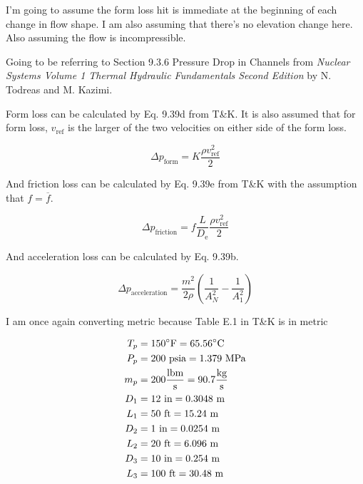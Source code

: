 \documentclass{article}
\begin{document}
I'm going to assume the form loss hit is immediate at the beginning of each change in flow shape. I am also assuming that there's no elevation change here. Also assuming the flow is incompressible.

Going to be referring to Section 9.3.6 Pressure Drop in Channels from \textit{Nuclear Systems Volume 1 Thermal Hydraulic Fundamentals Second Edition} by N. Todreas and M. Kazimi.

Form loss can be calculated by Eq. 9.39d from T\&K. It is also assumed that for form loss, $v_{\text{ref}}$ is the larger of the two velocities on either side of the form loss.

\begin{equation}
    \Delta p_{\text{form}} = K \frac{\rho v_{\text{ref}}^2}{2}
\end{equation}

And friction loss can be calculated by Eq. 9.39e from T\&K with the assumption that $f = \overline{f}$.

\begin{equation}
    \Delta p_{\text{friction}} = f \frac{L}{D_{\text{e}}} \frac{\rho v_{\text{ref}}^2}{2}
\end{equation}

And acceleration loss can be calculated by Eq. 9.39b.

\begin{equation}
    \Delta p_{\text{acceleration}} = \frac{m^2}{2 \rho} (\frac{1}{A_N^2} - \frac{1}{A_1^2})
\end{equation}

I am once again converting metric because Table E.1 in T\&K is in metric

\begin{align*}
    T_p &= 150 \degree \text{F} = 65.56 \degree \text{C} \\
    P_p &= 200 \text{ psia} = 1.379 \text{ MPa} \\
    m_p &= 200 \frac{\text{lbm}}{\text{s}} = 90.7 \frac{\text{kg}}{\text{s}} \\
    D_1 &= 12 \text{ in} = 0.3048 \text{ m} \\
    L_1 &= 50 \text{ ft} = 15.24 \text{ m} \\
    D_2 &= 1 \text{ in} = 0.0254 \text{ m} \\
    L_2 &= 20 \text{ ft} = 6.096 \text{ m} \\
    D_3 &= 10 \text{ in} = 0.254 \text{ m} \\
    L_3 &= 100 \text{ ft} = 30.48 \text{ m}
\end{align*}
\end{document}
